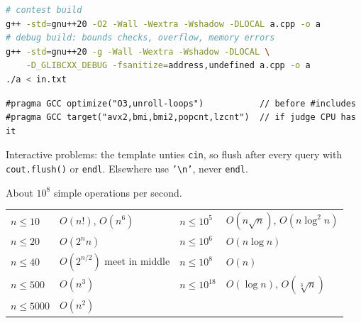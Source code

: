 \begin{lstlisting}[language=bash]
# contest build
g++ -std=gnu++20 -O2 -Wall -Wextra -Wshadow -DLOCAL a.cpp -o a
# debug build: bounds checks, overflow, memory errors
g++ -std=gnu++20 -g -Wall -Wextra -Wshadow -DLOCAL \
    -D_GLIBCXX_DEBUG -fsanitize=address,undefined a.cpp -o a
./a < in.txt
\end{lstlisting}

\begin{lstlisting}
#pragma GCC optimize("O3,unroll-loops")           // before #includes
#pragma GCC target("avx2,bmi,bmi2,popcnt,lzcnt")  // if judge CPU has it
\end{lstlisting}
{\scriptsize Interactive problems: the template unties \texttt{cin}, so flush after
every query with \texttt{cout.flush()} or \texttt{endl}. Elsewhere use \texttt{'\textbackslash n'},
never \texttt{endl}.\par}

{\scriptsize About $10^8$ simple operations per second.\par
\begin{tabular}{@{}ll|ll@{}}
$n \le 10$ & $O(n!)$, $O(n^6)$ & $n \le 10^5$ & $O(n\sqrt n)$, $O(n\log^2 n)$ \\
$n \le 20$ & $O(2^n n)$ & $n \le 10^6$ & $O(n\log n)$ \\
$n \le 40$ & $O(2^{n/2})$ meet in middle & $n \le 10^8$ & $O(n)$ \\
$n \le 500$ & $O(n^3)$ & $n \le 10^{18}$ & $O(\log n)$, $O(\sqrt[3]{n})$ \\
$n \le 5000$ & $O(n^2)$ & & \\
\end{tabular}\par}

